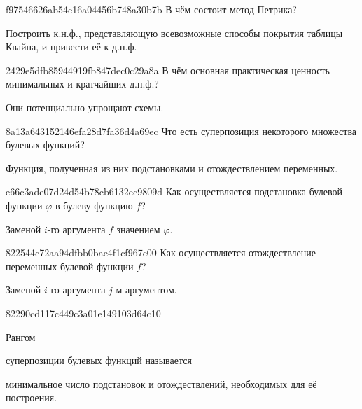 \begin{note}{f97546626ab54e16a04456b748a30b7b}
    В чём состоит метод Петрика?

    \begin{cloze}{1}
        Построить к.н.ф., представляющую всевозможные способы покрытия таблицы Квайна, и привести её к д.н.ф.
    \end{cloze}
\end{note}

\begin{note}{2429e5dfb85944919fb847dec0c29a8a}
    В чём основная практическая ценность минимальных и кратчайших д.н.ф.?

    \begin{cloze}{1}
        Они потенциально упрощают схемы.
   \end{cloze}
\end{note}

\begin{note}{8a13a643152146efa28d7fa36d4a69ec}
    Что есть суперпозиция некоторого множества булевых функций?

    \begin{cloze}{1}
        Функция, полученная из них подстановками и отождествлением переменных.
    \end{cloze}
\end{note}

\begin{note}{e66c3ade07d24d54b78cb6132ec9809d}
    Как осуществляется подстановка булевой функции \({ \varphi }\) в булеву функцию \({ f }\)?

    \begin{cloze}{1}
        Заменой \({ i }\)-го аргумента \({ f }\) значением \({ \varphi }\).
    \end{cloze}
\end{note}

\begin{note}{822544c72aa94dfbb0bae4f1cf967c00}
    Как осуществляется отождествление переменных булевой функции \({ f }\)?

    \begin{cloze}{1}
        Заменой \({ i }\)-го аргумента \({ j }\)-м аргументом.
    \end{cloze}
\end{note}

\begin{note}{82290cd117c449c3a01e149103d64c10}
    \begin{icloze}{2}Рангом\end{icloze} суперпозиции булевых функций называется \begin{icloze}{1}минимальное число подстановок и отождествлений, необходимых для её построения.\end{icloze}
\end{note}

